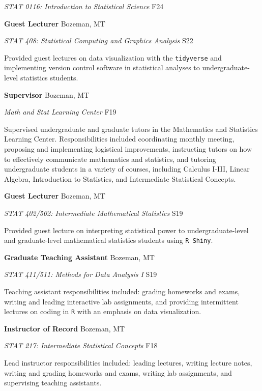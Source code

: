 \documentclass[a4paper]{article}
\begin{document}
\emph{STAT 0116: Introduction to Statistical Science} \hfill F24
\vspace*{2mm}

\textbf{Guest Lecturer} \hfill Bozeman, MT

\emph{STAT 408: Statistical Computing and Graphics Analysis} \hfill S22

Provided guest lectures on data visualization with the
\texttt{tidyverse} and implementing version control software in
statistical analyses to undergraduate-level statistics students.
\vspace*{2mm}

\textbf{Supervisor} \hfill Bozeman, MT

\emph{Math and Stat Learning Center} \hfill F19

Supervised undergraduate and graduate tutors in the Mathematics and
Statistics Learning Center. Responsibilities included coordinating
monthly meeting, proposing and implementing logistical improvements,
instructing tutors on how to effectively communicate mathematics and
statistics, and tutoring undergraduate students in a variety of courses,
including Calculus I-III, Linear Algebra, Introduction to Statistics,
and Intermediate Statistical Concepts.\vspace*{2mm}

\textbf{Guest Lecturer} \hfill Bozeman, MT

\emph{STAT 402/502: Intermediate Mathematical Statistics} \hfill S19

Provided guest lecture on interpreting statistical power to
undergraduate-level and graduate-level mathematical statistics students
using \texttt{R\ Shiny}. \vspace*{2mm}

\textbf{Graduate Teaching Assistant} \hfill Bozeman, MT

\emph{STAT 411/511: Methods for Data Analysis I} \hfill S19

Teaching assistant responsibilities included: grading homeworks and
exams, writing and leading interactive lab assignments, and providing
intermittent lectures on coding in \texttt{R} with an emphasis on data
visualization. \vspace*{2mm}

\textbf{Instructor of Record} \hfill Bozeman, MT

\emph{STAT 217: Intermediate Statistical Concepts} \hfill F18

Lead instructor responsibilities included: leading lectures, writing
lecture notes, writing and grading homeworks and exams, writing lab
assignments, and supervising teaching assistants. \vspace*{2mm}
\end{document}
